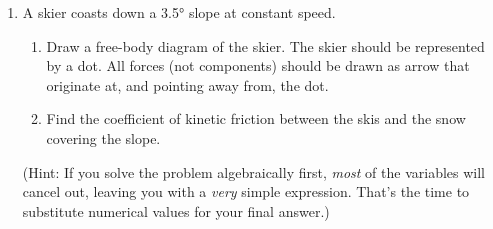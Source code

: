 \begin{enumerate}[itemsep=6pt]
\item A skier coasts down a \ang{3.5} slope at constant speed.
  \begin{enumerate}[itemsep=3pt]
  \item Draw a free-body diagram of the skier. The skier should be represented
    by a dot. All forces (not components) should be drawn as arrow that
    originate at, and pointing away from, the dot.
  \item Find the coefficient of kinetic friction between the skis and the snow
    covering the slope.
  \end{enumerate}
  (Hint: If you solve the problem algebraically first, \emph{most} of the
  variables will cancel out, leaving you with a \emph{very} simple expression.
  That's the time to substitute numerical values for your final answer.)
  
  

\end{enumerate}

